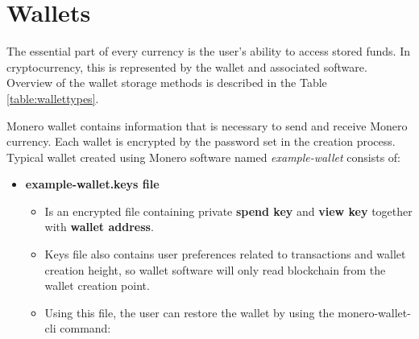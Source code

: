 \documentclass[
  printed, %
  table,   %
  lof,     %
  lot,     %
           oneside, color
]{fithesis3}
\begin{document}
\section{Wallets}
\label{sec:wallets}
The essential part of every currency is the user's ability to access stored funds. In cryptocurrency, this is represented by the wallet and associated software. Overview of the wallet storage methods is described in the Table \ref{table:wallettypes}.

Monero wallet contains information that is necessary to send and receive Monero currency. Each wallet is encrypted by the password set in the creation process. Typical wallet created using Monero software named \textit{example-wallet} consists of:
\begin{itemize}\itemsep0em
\item \textbf{example-wallet.keys file}
\begin{itemize}\itemsep0em
\item Is an encrypted file containing private \textbf{spend key} and \textbf{view key} together with \textbf{wallet address}.
\item Keys file also contains user preferences related to transactions and wallet creation height, so wallet software will only read blockchain from the wallet creation point.
\item Using this file, the user can restore the wallet by using the monero-wallet-cli command:


\end{itemize}
\end{itemize}
\end{document}
